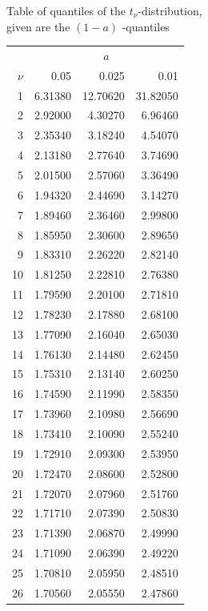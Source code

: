 \documentclass{article}
\begin{document}
\newpage 
	\begin{minipage}[t]{6cm}
		Table of quantiles of the $t_{\nu }$-distribution,\\ given are the $(1-a)$%
		-quantiles
		
		\begin{center}
			\begin{tabular}{|r|rrr|}
				\hline
				& \multicolumn{3}{|c|}{$a$} \\ 
				$\nu$ & 0.05 & 0.025 & 0.01 \\ \hline
				1 & 6.31380 & 12.70620 & 31.82050 \\
				2 & 2.92000 & 4.30270 & 6.96460 \\
				3 & 2.35340 & 3.18240 & 4.54070 \\
				4 & 2.13180 & 2.77640 & 3.74690 \\
				5 & 2.01500 & 2.57060 & 3.36490 \\
				6 & 1.94320 & 2.44690 & 3.14270 \\
				7 & 1.89460 & 2.36460 & 2.99800 \\
				8 & 1.85950 & 2.30600 & 2.89650 \\
				9 & 1.83310 & 2.26220 & 2.82140 \\
				10 & 1.81250 & 2.22810 & 2.76380 \\
				11 & 1.79590 & 2.20100 & 2.71810 \\
				12 & 1.78230 & 2.17880 & 2.68100 \\
				13 & 1.77090 & 2.16040 & 2.65030 \\
				14 & 1.76130 & 2.14480 & 2.62450 \\
				15 & 1.75310 & 2.13140 & 2.60250 \\
				16 & 1.74590 & 2.11990 & 2.58350 \\
				17 & 1.73960 & 2.10980 & 2.56690 \\
				18 & 1.73410 & 2.10090 & 2.55240 \\
				19 & 1.72910 & 2.09300 & 2.53950 \\
				20 & 1.72470 & 2.08600 & 2.52800 \\
				21 & 1.72070 & 2.07960 & 2.51760 \\
				22 & 1.71710 & 2.07390 & 2.50830 \\
				23 & 1.71390 & 2.06870 & 2.49990 \\
				24 & 1.71090 & 2.06390 & 2.49220 \\
				25 & 1.70810 & 2.05950 & 2.48510 \\
				26 & 1.70560 & 2.05550 & 2.47860 \\

\end{tabular}
\end{center}
\end{minipage}
\end{document}
